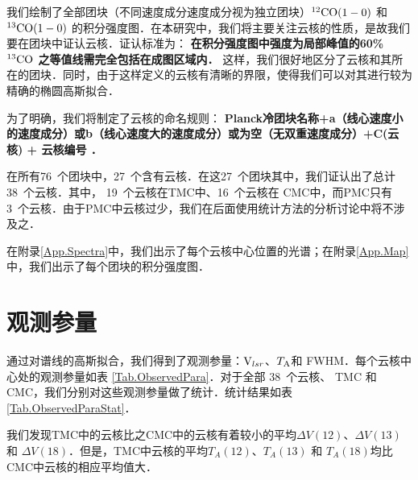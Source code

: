 \documentclass[UTF8, nocolorlinks]{pkuthss}
\newcommand{\cob}{$\rm ^{13}CO$ }
\newcommand{\coaa}{$\rm^{12}CO(1-0)$ }
\newcommand{\cobb}{$\rm^{13}CO(1-0)$ }
\newcommand{\vlsr}{${\rm V } _{lsr}$}
\newcommand{\ta}{$T_{\rm A}$}
\newcommand{\numcore}{38\ }
\newcommand{\numcoretmc}{19\ }
\newcommand{\numcorepmc}{3\ }
\newcommand{\numcorecmc}{16\ }
\newcommand{\numcompofcores}{27\ }
\newcommand{\numvelcomp}{76\ }
\begin{document}
		我们绘制了全部团块（不同速度成分速度成分视为独立团块）\coaa 和 \cobb 的积分强度图．在本研究中，我们将主要关注云核的性质，是故我们要在团块中证认云核．证认标准为：
		\textbf{在积分强度图中强度为局部峰值的60\% \cob 之等值线需完全包括在成图区域内．}
		这样，我们很好地区分了云核和其所在的团块．同时，由于这样定义的云核有清晰的界限，使得我们可以对其进行较为精确的椭圆高斯拟合．

		为了明确，我们将制定了云核的命名规则：
		\textbf{Planck冷团块名称+a（线心速度小的速度成分）或b（线心速度大的速度成分）或为空（无双重速度成分）+C(云核) + 云核编号 ．}

		在所有\numvelcomp 个团块中，\numcompofcores 个含有云核．在这\numcompofcores 个团块其中，我们证认出了总计\numcore 个云核．其中， \numcoretmc 个云核在TMC中、\numcorecmc 个云核在 CMC中，而PMC只有\numcorepmc 个云核．由于PMC中云核过少，我们在后面使用统计方法的分析讨论中将不涉及之．

		在附录\ref{App.Spectra}中，我们出示了每个云核中心位置的光谱；在附录\ref{App.Map}中，我们出示了每个团块的积分强度图．

	\section{观测参量}

		通过对谱线的高斯拟合，我们得到了观测参量：\vlsr、\ta 和 FWHM．每个云核中心处的观测参量如表 \ref{Tab.ObservedPara}．对于全部 \numcore 个云核、 TMC 和 CMC，我们分别对这些观测参量做了统计．统计结果如表 \ref{Tab.ObservedParaStat}．

        我们发现TMC中的云核比之CMC中的云核有着较小的平均$\Delta V (12)$、$\Delta V (13)$ 和 $\Delta V (18)$．但是，TMC中云核的平均$T_{A}(12)$、$T_{A}(13)$ 和 $T_{A}(18)$均比CMC中云核的相应平均值大．
\end{document}
